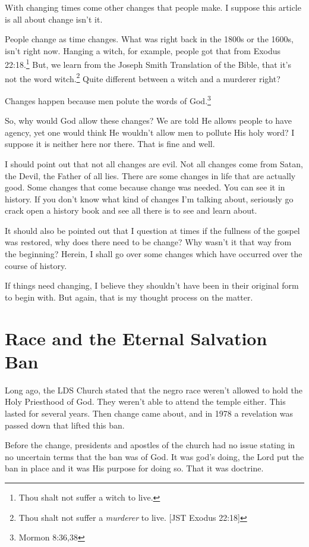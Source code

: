 \documentclass{article}
\begin{document}
With changing times come other changes that people make. I suppose this article 
is all about change isn't it.

People change as time changes. What was right back in the 1800s or the 1600s, 
isn't right now. Hanging a witch, for example, people got that from Exodus 
22:18.\footnote{Thou shalt not suffer a witch to live.} But, we learn from the 
Joseph Smith Translation of the Bible, that it's not the word 
witch.\footnote{Thou shalt not suffer a \textit{murderer} to live. 
[JST Exodus 22:18]} Quite different between a witch and a murderer right?

Changes happen because men polute the words of God.\footnote{Mormon 8:36,38}

So, why would God allow these changes? We are told He allows people to have
agency, yet one would think He wouldn't allow men to pollute His holy word?
I suppose it is neither here nor there. That is fine and well.

I should point out that not all changes are evil. Not all changes come from 
Satan, the Devil, the Father of all lies. There are some changes in life that 
are actually good. Some changes that come because change was needed. You can see 
it in history. If you don't know what kind of changes I'm talking about, 
seriously go crack open a history book and see all there is to see and learn 
about.

It should also be pointed out that I question at times if the fullness of the 
gospel was restored, why does there need to be change? Why wasn't it that way 
from the beginning? Herein, I shall go over some changes which have occurred
over the course of history.

If things need changing, I believe they shouldn't have been in their original
form to begin with. But again, that is my thought process on the matter.

\newpage

\section{Race and the Eternal Salvation Ban}

Long ago, the LDS Church stated that the negro race weren't allowed to hold the 
Holy Priesthood of God. They weren't able to attend the temple either. This 
lasted for several years. Then change came about, and in 1978 a revelation was 
passed down that lifted this ban.

Before the change, presidents and apostles of the church had no issue stating in 
no uncertain terms that the ban was of God. It was god's doing, the Lord put the 
ban in place and it was His purpose for doing so. That it was doctrine.
\end{document}
